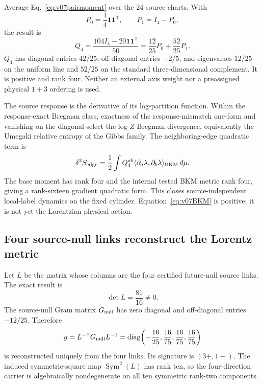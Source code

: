 \documentclass[11pt]{article}
\theoremstyle{definition}
\theoremstyle{remark}
\newcommand{\Sym}{\operatorname{Sym}}
\begin{document}
Average Eq.~\eqref{eq:v07pairmoment} over the 24 source charts. With
\begin{equation}
 P_0=\frac14\mathbf1\mathbf1^{\mathsf T},\qquad P_1=I_4-P_0,
\end{equation}
the result is
\begin{equation}\label{eq:v07Q4}
 Q_4=\frac{104I_4-20\mathbf1\mathbf1^{\mathsf T}}{50}
 =\frac{12}{25}P_0+\frac{52}{25}P_1.
\end{equation}
$Q_4$ has diagonal entries $42/25$, off-diagonal entries $-2/5$, and eigenvalues $12/25$ on the uniform line and $52/25$ on the standard three-dimensional complement. It is positive and rank four. Neither an external axis weight nor a preassigned physical $1+3$ ordering is used.

The source response is the derivative of its log-partition function. Within the response-exact Bregman class, exactness of the response-mismatch one-form and vanishing on the diagonal select the log-$Z$ Bregman divergence, equivalently the Umegaki relative entropy of the Gibbs family. The neighboring-edge quadratic term is
\begin{equation}\label{eq:v07BKM}
 \delta^2 S_{\rm edge}
 =\frac12\int Q_4^{ab}
 \langle\partial_a\lambda,\partial_b\lambda\rangle_{\rm BKM}\,d\mu.
\end{equation}
The base moment has rank four and the internal tested BKM metric rank four, giving a rank-sixteen gradient quadratic form. This closes source-independent local-label dynamics on the fixed cylinder. Equation~\eqref{eq:v07BKM} is positive; it is not yet the Lorentzian physical action.

\subsection{Four source-null links reconstruct the Lorentz metric}

Let $L$ be the matrix whose columns are the four certified future-null source links. The exact result is
\begin{equation}\label{eq:v07detL}
 \det L=\frac{81}{16}\neq0.
\end{equation}
The source-null Gram matrix $G_{\rm null}$ has zero diagonal and off-diagonal entries $-12/25$. Therefore
\begin{equation}\label{eq:v07g}
 g=L^{-\mathsf T}G_{\rm null}L^{-1}
 =\operatorname{diag}\!\left(
 -\frac{16}{25},\frac{16}{75},\frac{16}{75},\frac{16}{75}
 \right)
\end{equation}
is reconstructed uniquely from the four links. Its signature is $(3+,1-)$. The induced symmetric-square map $\Sym^2(L)$ has rank ten, so the four-direction carrier is algebraically nondegenerate on all ten symmetric rank-two components.
\end{document}
